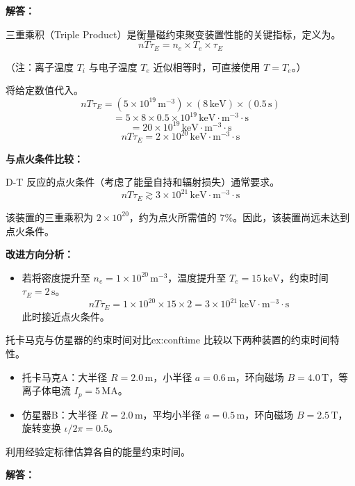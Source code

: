 \textbf{解答：}

三重乘积（Triple Product）是衡量磁约束聚变装置性能的关键指标，定义为。
\begin{equation}
    nT\tau_E = n_e \times T_e \times \tau_E
\label{eq:ch10-triple-product}
\end{equation}

（注：离子温度 $T_i$ 与电子温度 $T_e$ 近似相等时，可直接使用 $T=T_e$。）

将给定数值代入。
\[
    nT\tau_E = (5\times10^{19}\,\mathrm{m^{-3}}) \times (8\,\mathrm{keV}) \times (0.5\,\mathrm{s})
\]
\[
    = 5\times8\times0.5 \times 10^{19}\,\mathrm{keV\cdot m^{-3}\cdot s}
\]
\[
    = 20 \times 10^{19}\,\mathrm{keV\cdot m^{-3}\cdot s}
\]
\[
    \boxed{nT\tau_E = 2\times10^{20}\,\mathrm{keV\cdot m^{-3}\cdot s}}
\]

\textbf{与点火条件比较：}

D-T 反应的点火条件（考虑了能量自持和辐射损失）通常要求。
\[
    nT\tau_E \gtrsim 3\times10^{21}\,\mathrm{keV\cdot m^{-3}\cdot s}
\]

该装置的三重乘积为 $2\times10^{20}$，约为点火所需值的 $7\%$。因此，该装置尚远未达到点火条件。

\textbf{改进方向分析：}
\begin{itemize}
    \item 若将密度提升至 $n_e=1\times10^{20}\,\mathrm{m^{-3}}$，温度提升至 $T_e=15\,\mathrm{keV}$，约束时间 $\tau_E=2\,\mathrm{s}$。
    \[
        nT\tau_E = 1\times10^{20}\times15\times2 = 3\times10^{21}\,\mathrm{keV\cdot m^{-3}\cdot s}
    \]
    此时接近点火条件。
\end{itemize}


\begin{example}{托卡马克与仿星器的约束时间对比}{ex:conftime}
比较以下两种装置的约束时间特性。
\begin{itemize}
    \item 托卡马克A：大半径 $R=2.0\,\mathrm{m}$，小半径 $a=0.6\,\mathrm{m}$，环向磁场 $B=4.0\,\mathrm{T}$，等离子体电流 $I_p=5\,\mathrm{MA}$。
    \item 仿星器B：大半径 $R=2.0\,\mathrm{m}$，平均小半径 $a=0.5\,\mathrm{m}$，环向磁场 $B=2.5\,\mathrm{T}$，旋转变换 $\iota/2\pi = 0.5$。
\end{itemize}
利用经验定标律估算各自的能量约束时间。
\end{example}

\textbf{解答：}

